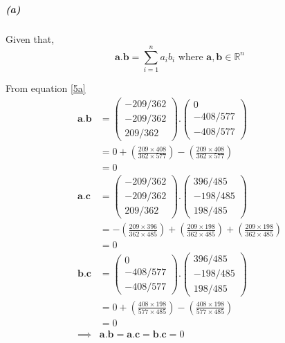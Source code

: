 \documentclass[12pt, letterpaper]{article}
\begin{document}
\subparagraph{(a)} Given that,
\begin{equation}
\label{5a}
\mathbf{a.b} = \sum_{i=1}^n a_ib_i\text{ where }\mathbf{a,b}\in\mathbb{R}^n
\end{equation}

From equation \ref{5a}
\[\begin{split}
  \mathbf{a.b} &= \begin{pmatrix} -209/362\\-209/362\\209/362 \end{pmatrix} 
                .\begin{pmatrix} 0\\-408/577\\-408/577 \end{pmatrix}\\
  &= 0 + \left(\frac{209\times408}{362\times577}\right) - \left(\frac{209\times408}{362\times577}\right)\\
  &= 0\\
  \mathbf{a.c} &= \begin{pmatrix} -209/362\\-209/362\\209/362 \end{pmatrix} 
                .\begin{pmatrix} 396/485\\-198/485\\198/485 \end{pmatrix}\\
  &= -\left(\frac{209\times396}{362\times485}\right)
  + \left(\frac{209\times198}{362\times485}\right)
  + \left(\frac{209\times198}{362\times485}\right)\\
  &= 0\\
  \mathbf{b.c} &= \begin{pmatrix} 0\\-408/577\\-408/577 \end{pmatrix} 
                .\begin{pmatrix} 396/485\\-198/485\\198/485 \end{pmatrix}\\
  &= 0 + \left(\frac{408\times198}{577\times485}\right) - \left(\frac{408\times198}{577\times485}\right)\\
  &= 0\\
  \implies &\boxed{\mathbf{a.b} = \mathbf{a.c} = \mathbf{b.c} = 0}
\end{split} \]
\end{document}
